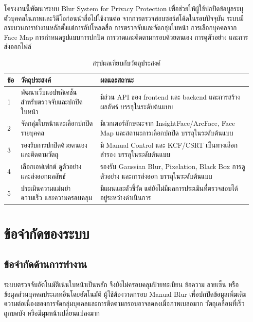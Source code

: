 โครงงานนี้พัฒนาระบบ Blur System for Privacy Protection เพื่อช่วยให้ผู้ใช้ปกปิดข้อมูลระบุตัวบุคคลในภาพและวิดีโอก่อนนำสื่อไปใช้งานต่อ จากการตรวจสอบซอร์สโค้ดในรอบปัจจุบัน ระบบมีกระบวนการทำงานหลักตั้งแต่การอัปโหลดสื่อ การตรวจจับและจัดกลุ่มใบหน้า การเลือกบุคคลจาก Face Map การกำหนดรูปแบบการปกปิด การวาดและติดตามกรอบด้วยตนเอง การดูตัวอย่าง และการส่งออกไฟล์

\begin{table}[H]
\centering
\caption{สรุปผลเทียบกับวัตถุประสงค์}
\label{tab:objective-summary}
\begin{tabular}{|p{}|p{}|p{}|}
\hline
\textbf{ข้อ} & \textbf{วัตถุประสงค์} & \textbf{ผลและสถานะ} \\
\hline
1 & พัฒนาเว็บแอปพลิเคชันสำหรับตรวจจับและปกปิดใบหน้า & มีส่วน API ของ frontend และ backend และการสร้างผลลัพธ์ บรรลุในระดับต้นแบบ \\
\hline
2 & จัดกลุ่มใบหน้าและเลือกปกปิดรายบุคคล & มีเวกเตอร์ลักษณะจาก InsightFace/ArcFace, Face Map และสถานะการเลือกปกปิด บรรลุในระดับต้นแบบ \\
\hline
3 & รองรับการปกปิดด้วยตนเองและติดตามวัตถุ & มี Manual Control และ KCF/CSRT เป็นทางเลือกสำรอง บรรลุในระดับต้นแบบ \\
\hline
4 & เลือกเอฟเฟกต์ ดูตัวอย่าง และส่งออกผลลัพธ์ & รองรับ Gaussian Blur, Pixelation, Black Box การดูตัวอย่าง และการส่งออก บรรลุในระดับต้นแบบ \\
\hline
5 & ประเมินความแม่นยำ ความเร็ว และความครอบคลุม & มีแผนและตัวชี้วัด แต่ยังไม่มีผลการประเมินที่ตรวจสอบได้ อยู่ระหว่างดำเนินการ \\
\hline
\end{tabular}
\end{table}

\section{ข้อจำกัดของระบบ}

\subsection{ข้อจำกัดด้านการทำงาน}

ระบบตรวจจับอัตโนมัติเน้นใบหน้าเป็นหลัก จึงยังไม่ครอบคลุมป้ายทะเบียน ข้อความ ลายเซ็น หรือข้อมูลส่วนบุคคลประเภทอื่นโดยอัตโนมัติ ผู้ใช้ต้องวาดกรอบ Manual Blur เพื่อปกปิดข้อมูลเพิ่มเติม ความต่อเนื่องของการจัดกลุ่มบุคคลและการติดตามกรอบอาจลดลงเมื่อภาพเบลอมาก วัตถุเคลื่อนที่เร็ว ถูกบดบัง หรือมีมุมหน้าเปลี่ยนแปลงมาก

